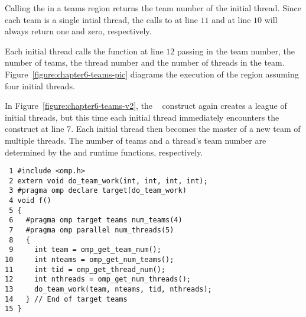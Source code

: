 Calling the  in a teams region returns the team
number of the initial thread.  Since each team is a single intial thread, the calls to
 at line $11$ and  at line $10$
will always return one and zero, respectively. 

Each initial thread calls the function  at line $12$ passing in
the team number, the number of teams, the thread number and the number of threads in the
team.  Figure~\ref{figure:chapter6-teams-pic} diagrams the execution of the
region assuming four initial threads.

\begin{figure*}[!tbh]
\centering
{}
\caption{ \textbf{The target teams construct creates a league of initial 
               threads} -- \small
        Each initial thread is a team of one thread.  The inital threads
        execute the teams region in parallel.
        }
\label{figure:chapter6-teams-pic}
\end{figure*}

In Figure~\ref{figure:chapter6-teams-v2}, the ~ construct again
creates a league of initial threads, but this time each initial thread
immediately encounters the  construct at line $7$. Each initial thread then
becomes the master of a new team of multiple threads.  The number of teams and
a thread's team number are determined by the  and
 runtime functions, respectively.

\begin{figure*}[!tbh]
\begin{verbatim}
 1 #include <omp.h>
 2 extern void do_team_work(int, int, int, int);
 3 #pragma omp declare target(do_team_work)
 4 void f()
 5 {
 6   #pragma omp target teams num_teams(4)
 7   #pragma omp parallel num_threads(5)
 8   {
 9     int team = omp_get_team_num();
10     int nteams = omp_get_num_teams();
11     int tid = omp_get_thread_num();
12     int nthreads = omp_get_num_threads();
13     do_team_work(team, nteams, tid, nthreads);
14   } // End of target teams
15 }
\end{verbatim}
\caption{ \textbf {Example of a parallel construct nested in a 
                   target teams construct} -- \small
          Multiple teams of threads execute the function \texttt{do\_team\_work()}.     
         }
\label{figure:chapter6-teams-v2}
\end{figure*}

